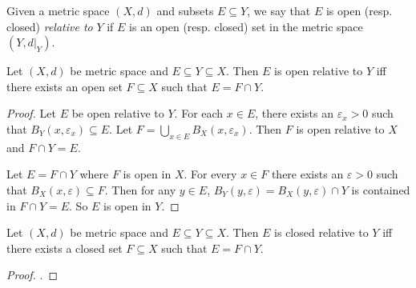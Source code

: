 \begin{definition*} \label{def:relative_topology}
    Given a metric space $(X, d)$ and subsets $E \subseteq Y$,
    we say that $E$ is open (resp. closed) \emph{relative to} $Y$
    if $E$ is an open (resp. closed) set in the metric space $(Y, d\vert_Y)$.
\end{definition*}
\begin{proposition} \label{thm:relative:open}
    Let $(X, d)$ be metric space and $E \subseteq Y \subseteq X$.
    Then $E$ is open relative to $Y$ iff there exists an open set
    $F \subseteq X$ such that $E = F \cap Y$.
\end{proposition}
\begin{proof}
    Let $E$ be open relative to $Y$.
    For each $x \in E$, there exists an $\varepsilon_x > 0$ such that
    $B_Y(x, \varepsilon_x) \subseteq E$.
    Let $F = \bigcup_{x \in E} B_X(x, \varepsilon_x)$.
    Then $F$ is open relative to $X$ and $F \cap Y = E$.

    Let $E = F \cap Y$ where $F$ is open in $X$.
    For every $x \in F$ there exists an $\varepsilon > 0$ such that
    $B_X(x, \varepsilon) \subseteq F$.
    Then for any $y \in E$,
    $B_Y(y, \varepsilon) = B_X(y, \varepsilon) \cap Y$ is contained in
    $F \cap Y = E$.
    So $E$ is open in $Y$.
\end{proof}
\begin{corollary} \label{thm:relative:closed}
    Let $(X, d)$ be metric space and $E \subseteq Y \subseteq X$.
    Then $E$ is closed relative to $Y$ iff there exists a closed set
    $F \subseteq X$ such that $E = F \cap Y$.
\end{corollary}
\begin{proof}
    .
\end{proof}
